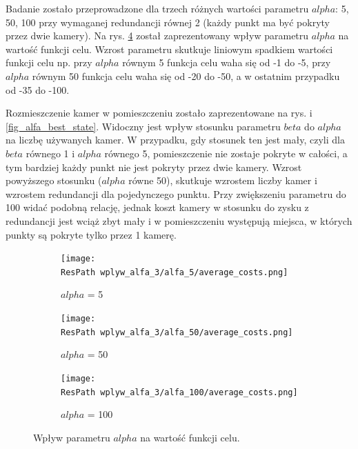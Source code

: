 \documentclass[12pt,a4paper]{article}
\newcommand{\ResPath}{../badania/}
\begin{document}
Badanie zostało przeprowadzone dla trzech różnych wartości parametru $alpha$: 5, 50, 100 przy wymaganej redundancji równej 2 (każdy punkt ma być pokryty przez dwie kamery).
Na rys. \ref{fig_alfa} został zaprezentowany wpływ parametru $alpha$ na wartość funkcji celu. 
Wzrost parametru skutkuje liniowym spadkiem wartości funkcji celu np. przy $alpha$ równym 5 funkcja celu waha się od -1 do -5, przy $alpha$ równym 50 funkcja celu waha się od -20 do -50, a w ostatnim przypadku od -35 do -100.

Rozmieszczenie kamer w pomieszczeniu zostało zaprezentowane na rys. i \ref{fig_alfa_best_state}.
Widoczny jest wpływ stosunku parametru $beta$ do $alpha$ na liczbę używanych kamer.
W przypadku, gdy stosunek ten jest mały, czyli dla $beta$ równego 1 i $alpha$ równego 5, pomieszczenie nie zostaje pokryte w całości, a tym bardziej każdy punkt nie jest pokryty przez dwie kamery.
Wzrost powyższego stosunku ($alpha$ równe 50), skutkuje wzrostem liczby kamer i wzrostem redundancji dla pojedynczego punktu.
Przy zwiększeniu parametru do 100 widać podobną relację, jednak koszt kamery w stosunku do zysku z redundancji jest wciąż zbyt mały i w pomieszczeniu występują miejsca, w których punkty są pokryte tylko przez 1 kamerę.


\begin{figure}[htb]
  \begin{subfigure}[b]{0.5\linewidth}
    \centering
    \texttt{[image: \\ResPath wplyw\_alfa\_3/alfa\_5/average\_costs.png]}
    \caption{$alpha$ = 5}
    \label{fig_alfa:a}
    \vspace{2ex}
  \end{subfigure}%
  \begin{subfigure}[b]{0.5\linewidth}
    \texttt{[image: \\ResPath wplyw\_alfa\_3/alfa\_50/average\_costs.png]}
    \caption{$alpha$ = 50}
    \label{fig_alfa:b}
    \vspace{2ex}
  \end{subfigure}
  \begin{subfigure}[b]{0.5\linewidth}
    \centering
    \texttt{[image: \\ResPath wplyw\_alfa\_3/alfa\_100/average\_costs.png]}
    \caption{$alpha$ = 100}
    \label{fig_alfa:c}
  \end{subfigure}%

  \caption{Wpływ parametru $alpha$ na wartość funkcji celu.}
  \label{fig_alfa}
\end{figure}
\restoregeometry
\end{document}
